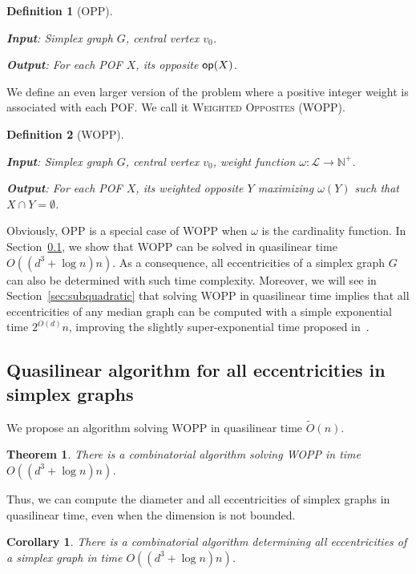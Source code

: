 \documentclass{article}
\newtheorem{theorem}{Theorem}
\newtheorem{definition}{Definition}
\newtheorem{corollary}{Corollary}
\newcommand{\opp}{\mbox{\textsf{op}}}
\begin{document}
\begin{definition}[OPP]~

\textbf{Input}: Simplex graph $G$, central vertex $v_0$.

\textbf{Output}: For each POF $X$, its opposite $\opp(X)$.
\label{def:dpp}
\end{definition}

We define an even larger version of the problem where a positive integer weight is associated with each POF. We call it \textsc{Weighted Opposites} (WOPP).

\begin{definition}[WOPP]~

\textbf{Input}: Simplex graph $G$, central vertex $v_0$, weight function $\omega : \mathcal{L} \rightarrow \mathbb{N}^+$.

\textbf{Output}: For each POF $X$, its weighted opposite $Y$ maximizing $\omega(Y)$ such that $X \cap Y = \emptyset$.
\label{def:wdpp}
\end{definition}

Obviously, OPP is a special case of WOPP when $\omega$ is the cardinality function. In Section~\ref{subsec:partitioning}, we show that WOPP can be solved in quasilinear time $O((d^3+\log n)n)$. As a consequence, all eccentricities of a simplex graph $G$ can also be determined with such time complexity. Moreover, we will see in Section~\ref{sec:subquadratic} that solving WOPP in quasilinear time implies that all eccentricities of any median graph can be computed with a simple exponential time $2^{O(d)}n$, improving the slightly super-exponential time proposed in~\cite{BeHa21}.

\subsection{Quasilinear algorithm for all eccentricities in simplex graphs} \label{subsec:partitioning}

We propose an algorithm solving WOPP in quasilinear time $\tilde{O}(n)$. 

\begin{theorem}
There is a combinatorial algorithm solving WOPP in time $O((d^3+\log n)n)$. 
\label{th:solving_wopp}
\end{theorem}

Thus, we can compute the diameter and all eccentricities of simplex graphs in quasilinear time, even when the dimension is not bounded.

\begin{corollary}
There is a combinatorial algorithm determining all eccentricities of a simplex graph in time $O((d^3+\log n)n)$.
\label{co:linear_simplex}
\end{corollary}
\end{document}
